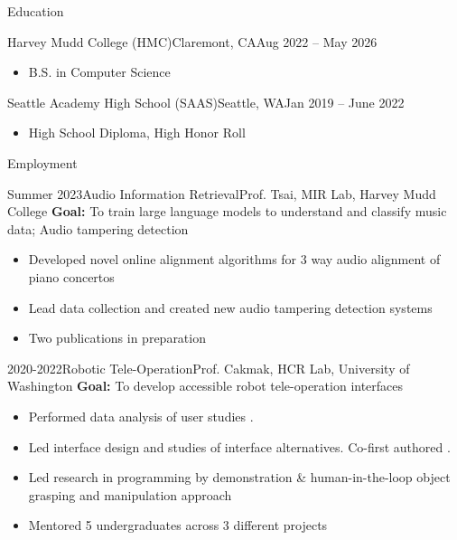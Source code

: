 \documentclass[]{mcdowellcv}
\begin{document}
\makeheader


\begin{cvsection}{Education}
	\begin{cvsubsection}{Harvey Mudd College (HMC)}{Claremont, CA}{Aug 2022 -- May 2026}
		\begin{itemize}
			\item B.S. in Computer Science%
		\end{itemize}
	\end{cvsubsection}
	\begin{cvsubsection}{Seattle Academy High School (SAAS)}{Seattle, WA}{Jan 2019 -- June 2022}
		\begin{itemize}
			\item High School Diploma, High Honor Roll%
		\end{itemize}
	\end{cvsubsection}
\end{cvsection}

\begin{cvsection}{Employment}
	\begin{cvsubsection}{Summer 2023}{Audio Information Retrieval}{Prof. Tsai, MIR Lab, Harvey Mudd College}
		\textbf{Goal:} To train large language models to understand and classify music data; Audio tampering detection
		\begin{itemize}
			\item Developed novel online alignment algorithms for 3 way audio alignment of piano concertos
			\item Lead data collection and created new audio tampering detection systems
			\item Two publications in preparation
		\end{itemize}
	\end{cvsubsection}
	\begin{cvsubsection}{2020-2022}{Robotic Tele-Operation}{Prof. Cakmak, HCR Lab, University of Washington}
		\textbf{Goal:} To develop accessible robot tele-operation interfaces
		\begin{itemize}
			\item Performed data analysis of user studies .
			\item Led interface design and studies of interface alternatives. Co-first authored  .
			\item Led research in programming by demonstration \& human-in-the-loop object grasping and manipulation approach
			\item Mentored 5 undergraduates across 3 different projects
		\end{itemize}
	\end{cvsubsection}
\end{cvsection}
\end{document}
